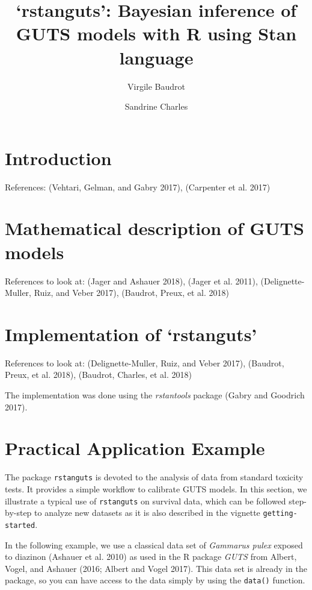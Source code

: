 \documentclass[fleqn,10pt,lineno]{wlpeerj} %
\title{`rstanguts': Bayesian inference of GUTS models with R using Stan
language}
\author[1]{Virgile Baudrot}
\author[1]{Sandrine Charles}
\affil[1]{UMR CNRS 5558 LBBE, Université Lyon 1, 43 Boulevard du 11 Novembre 1918,
69100 Villeurbanne}
\begin{document}
\flushbottom
\maketitle
\thispagestyle{empty}

\section*{Introduction}\label{introduction}

References: (Vehtari, Gelman, and Gabry 2017), (Carpenter et al. 2017)

\section*{Mathematical description of GUTS
models}\label{mathematical-description-of-guts-models}

References to look at: (Jager and Ashauer 2018), (Jager et al. 2011),
(Delignette-Muller, Ruiz, and Veber 2017), (Baudrot, Preux, et al. 2018)

\section{\texorpdfstring{Implementation of
`rstanguts'}{Implementation of rstanguts}}\label{implementation-of-rstanguts}

References to look at: (Delignette-Muller, Ruiz, and Veber 2017),
(Baudrot, Preux, et al. 2018), (Baudrot, Charles, et al. 2018)

The implementation was done using the \emph{rstantools} package (Gabry
and Goodrich 2017).

\section{Practical Application
Example}\label{practical-application-example}

The package \texttt{rstanguts} is devoted to the analysis of data from
standard toxicity tests. It provides a simple workflow to calibrate GUTS
models. In this section, we illustrate a typical use of
\texttt{rstanguts} on survival data, which can be followed step-by-step
to analyze new datasets as it is also described in the vignette
\texttt{getting-started}.

In the following example, we use a classical data set of \emph{Gammarus
pulex} exposed to diazinon (Ashauer et al. 2010) as used in the R
package \emph{GUTS} from Albert, Vogel, and Ashauer (2016; Albert and
Vogel 2017). This data set is already in the package, so you can have
access to the data simply by using the \texttt{data()} function.
\end{document}

